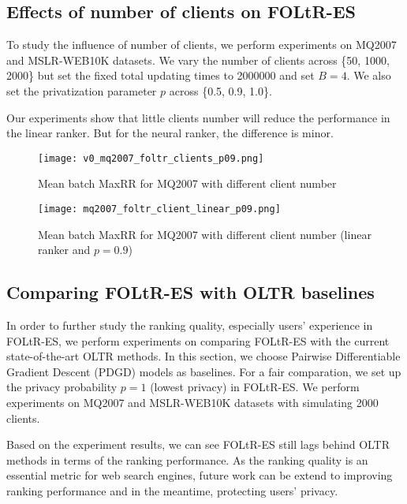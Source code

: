 \subsection{Effects of number of clients on FOLtR-ES}

To study the influence of number of clients, we perform experiments on MQ2007 and MSLR-WEB10K datasets. We vary the number of clients across \{50, 1000, 2000\} but set the fixed total updating times to 2000000 and set $B = 4$. We also set the privatization parameter $p$ across \{0.5, 0.9, 1.0\}.

Our experiments show that little clients number will reduce the performance in the linear ranker. But for the neural ranker, the difference is minor.

\begin{figure}[H]
	\centering
	\texttt{[image: v0\_mq2007\_foltr\_clients\_p09.png]}
	\caption{Mean batch MaxRR for MQ2007 with different client number}
	\label{fig: mq2007clients}
\end{figure}
\begin{figure}[H]
	\centering
	\texttt{[image: mq2007\_foltr\_client\_linear\_p09.png]}
	\caption{Mean batch MaxRR for MQ2007 with different client number (linear ranker and $p = 0.9$)}
	\label{fig: mq2007-rq2-0.9}
\end{figure}

\subsection{Comparing FOLtR-ES with OLTR baselines}

In order to further study the ranking quality, especially users' experience in FOLtR-ES, we perform experiments on comparing FOLtR-ES with the current state-of-the-art OLTR methods. In this section, we choose Pairwise Differentiable Gradient Descent (PDGD) models as baselines. For a fair comparation, we set up the privacy probability $p = 1$ (lowest privacy) in FOLtR-ES. We perform experiments on MQ2007 and MSLR-WEB10K datasets with simulating 2000 clients.

Based on the experiment results, we can see FOLtR-ES still lags behind OLTR methods in terms of the ranking performance. As the ranking quality is an essential metric for web search engines, future work can be extend to improving ranking performance and in the meantime, protecting users' privacy.

